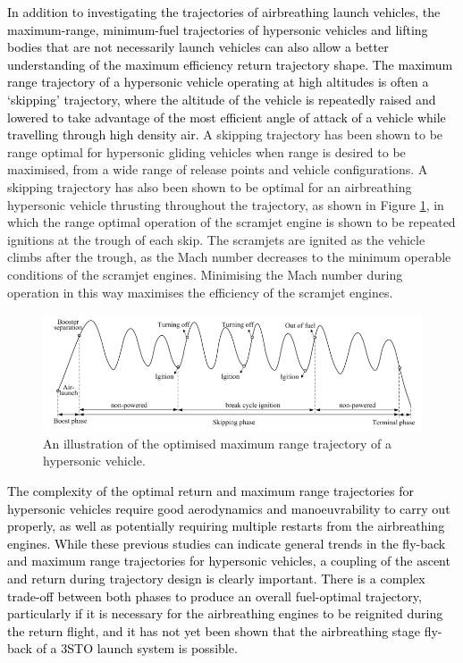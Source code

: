 \textcolor{black}{
	In addition to investigating the trajectories of airbreathing launch vehicles, the maximum-range, minimum-fuel trajectories of hypersonic vehicles and lifting bodies that are not necessarily launch vehicles can also allow a better understanding of the maximum efficiency return trajectory shape. The maximum range trajectory of a hypersonic vehicle operating at high altitudes is often a `skipping' trajectory, where the altitude of the vehicle is repeatedly raised and lowered to take advantage of the most efficient angle of attack of a vehicle while travelling through high density air\cite{Moshman2014,Darby2011,Toso2015,Chai2015,Pesch1980}.} A skipping trajectory has been shown to be range optimal for hypersonic gliding vehicles when range is desired to be maximised, from a wide range of release points and vehicle configurations\cite{Eggers1957,Moshman2014,Pesch1980,Moshman2014,Darby2011,Toso2015,Tetlow1992,Darby2011}. A skipping trajectory has also been shown to be optimal for an airbreathing hypersonic vehicle thrusting throughout the trajectory\cite{Kanda2007,Chai2015}, as shown in Figure \ref{fig:chai-boostskip}, in which the range optimal operation of the scramjet engine is shown to be repeated ignitions at the trough of each skip\cite{Chai2015}. The scramjets are ignited as the vehicle climbs after the trough, as the Mach number decreases to the minimum operable conditions of the scramjet engines\cite{Chai2015}. Minimising the Mach number during operation in this way maximises the efficiency of the scramjet engines\cite{Chai2015}.
\begin{figure}[ht]
	\centering
	\includegraphics[width=0.9\linewidth]{"figures/2_literature-review/chai-boost skip"}
	\caption{An illustration of the optimised maximum range trajectory of a hypersonic vehicle\cite{Chai2015}.}
	\label{fig:chai-boostskip}
\end{figure}

\textcolor{black}{
The complexity of the optimal return and maximum range trajectories for hypersonic vehicles require good aerodynamics and manoeuvrability to carry out properly, as well as potentially requiring multiple restarts from the airbreathing engines. While these previous studies can indicate general trends in the fly-back and maximum range trajectories for hypersonic vehicles, a coupling of the ascent and return during trajectory design is clearly important. There is a complex trade-off between both phases to produce an overall fuel-optimal trajectory, particularly if it is necessary for the airbreathing engines to be reignited during the return flight, and it has not yet been shown that the airbreathing stage fly-back of a 3STO launch system is possible. 
}




